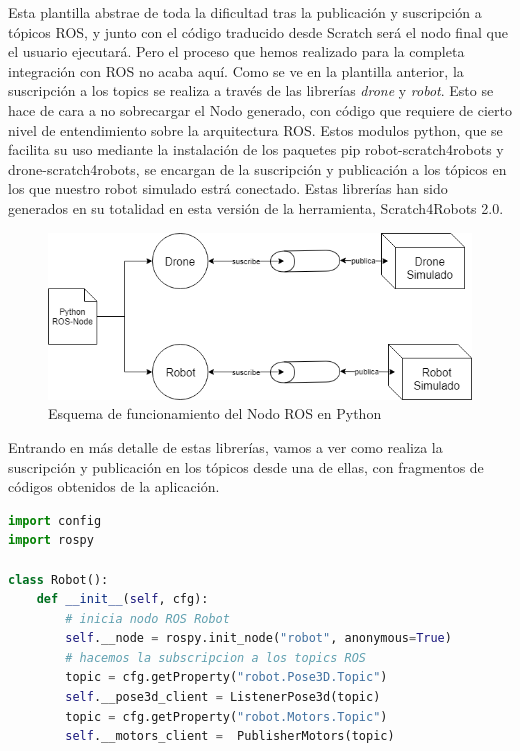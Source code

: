 Esta plantilla abstrae de toda la dificultad tras la publicación y suscripción a tópicos ROS, y junto con el código traducido desde Scratch será el nodo final que el usuario ejecutará. Pero el proceso que hemos realizado para la completa integración con ROS no acaba aquí. Como se ve en la plantilla anterior, la suscripción a los topics se realiza a través de las librerías \textit{drone} y \textit{robot}. Esto se hace de cara a no sobrecargar el Nodo generado, con código que requiere de cierto nivel de entendimiento sobre la arquitectura ROS. Estos modulos python, que se facilita su uso mediante la instalación de los paquetes pip robot-scratch4robots y drone-scratch4robots, se encargan de la suscripción y publicación a los tópicos en los que nuestro robot simulado estrá conectado. Estas librerías han sido generados en su totalidad en esta versión de la herramienta, Scratch4Robots 2.0.\\

\begin{figure}[H]
    \centering
    \includegraphics[scale=0.6]{img/s4r-diagrama-robot.png}
  	\caption{Esquema de funcionamiento del Nodo ROS en Python}
  	\label{fig:s4r-esquema}
\end{figure}

Entrando en más detalle de estas librerías, vamos a ver como realiza la suscripción y publicación en los tópicos desde una de ellas, con fragmentos de códigos obtenidos de la aplicación.\\

\begin{lstlisting}[language=python,firstnumber=1]
import config
import rospy

class Robot():
    def __init__(self, cfg):
        # inicia nodo ROS Robot
        self.__node = rospy.init_node("robot", anonymous=True)
        # hacemos la subscripcion a los topics ROS
        topic = cfg.getProperty("robot.Pose3D.Topic")
        self.__pose3d_client = ListenerPose3d(topic)
        topic = cfg.getProperty("robot.Motors.Topic")
        self.__motors_client =  PublisherMotors(topic)
\end{lstlisting}

